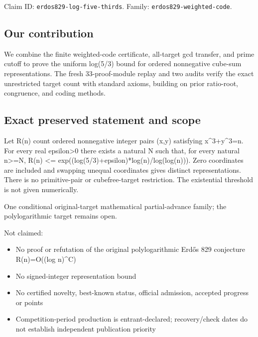 \documentclass[11pt,a4paper]{article}
\begin{document}
Claim ID: \texttt{erdos829-log-five-thirds}. Family: \texttt{erdos829-weighted-code}.

\subsection{Our contribution}
We combine the finite weighted-code certificate, all-target gcd transfer, and prime cutoff to prove the uniform log(5/3) bound for ordered nonnegative cube-sum representations. The fresh 33-proof-module replay and two audits verify the exact unrestricted target count with standard axioms, building on prior ratio-root, congruence, and coding methods.

\subsection{Exact preserved statement and scope}
Let R(n) count ordered nonnegative integer pairs (x,y) satisfying x\textasciicircum{}3+y\textasciicircum{}3=n. For every real epsilon>0 there exists a natural N such that, for every natural n>=N, R(n) <= exp((log(5/3)+epsilon)*log(n)/log(log(n))). Zero coordinates are included and swapping unequal coordinates gives distinct representations. There is no primitive-pair or cubefree-target restriction. The existential threshold is not given numerically.

One conditional original-target mathematical partial-advance family; the polylogarithmic target remains open.

Not claimed:

\begin{itemize}
\item No proof or refutation of the original polylogarithmic Erdős 829 conjecture R(n)=O((log n)\textasciicircum{}C)
\end{itemize}
\begin{itemize}
\item No signed-integer representation bound
\end{itemize}
\begin{itemize}
\item No certified novelty, best-known status, official admission, accepted progress or points
\end{itemize}
\begin{itemize}
\item Competition-period production is entrant-declared; recovery/check dates do not establish independent publication priority
\end{itemize}
\end{document}

